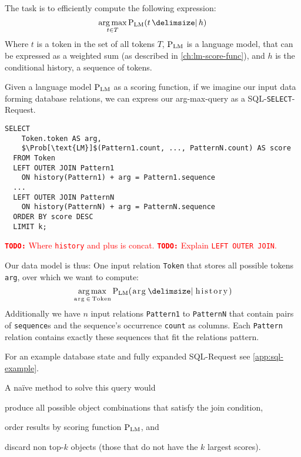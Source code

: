 \documentclass[11pt,a4paper]{report}
\DeclareMathOperator*{\Argmax}{arg\,max}
\newcommand{\inlinecode}[1]{\lstinline[columns=fixed]{#1}}
\newcommand{\todo}[1]{\textcolor{red}{{\footnotesize\textbf{\texttt{TODO:}}} #1}}
\begin{document}
The task is to efficiently compute the following expression:
\begin{equation}
  \Argmax_{t \in T} \Prob[\text{LM}]{t}{h}
\end{equation}
Where $t$ is a token in the set of all tokens $T$, $\Prob[\text{LM}]$ is a
language model, that can be expressed as a weighted sum (as described in
\cref{ch:lm-score-func}), and $h$ is the conditional history, a sequence
of tokens.

Given a language model $\Prob[\text{LM}]$ as a scoring function, if we
imagine our input data forming database relations, we can express our
arg-max-query as a SQL-\texttt{SELECT}-Request.

\begin{lstlisting}[mathescape]
  SELECT
    Token.token AS arg,
    $\Prob[\text{LM}]$(Pattern1.count, ..., PatternN.count) AS score
  FROM Token
  LEFT OUTER JOIN Pattern1
    ON history(Pattern1) + arg = Pattern1.sequence
  ...
  LEFT OUTER JOIN PatternN
    ON history(PatternN) + arg = PatternN.sequence
  ORDER BY score DESC
  LIMIT k;
\end{lstlisting}

\todo{Where \inlinecode{history} and plus is concat.}
\todo{Explain \inlinecode{LEFT OUTER JOIN}.}

Our data model is thus: One input relation \inlinecode{Token} that stores
all possible tokens \inlinecode{arg}, over which we want to compute:
\begin{equation}
  \Argmax_{\text{\inlinecode{arg}} \, \in \, \text{\inlinecode{Token}}}
    \Prob[\text{LM}]{\text{\inlinecode{arg}}}{\text{\inlinecode{history}}}
\end{equation}
Additionally we have $n$ input relations
\inlinecode{Pattern1} to \inlinecode{PatternN} that contain pairs
of \inlinecode{sequence}s and the sequence's occurrence \inlinecode{count} as
columns.
Each \inlinecode{Pattern} relation contains exactly these sequences that fit the
relations pattern.

For an example database state and fully expanded SQL-Request see
\cref{app:sql-example}.

A naïve method to solve this query would
\begin{inparaenum}[(1)]
  \item produce all possible object combinations that satisfy the join
    condition,
  \item order results by scoring function $\Prob[\text{LM}]$, and
  \item discard non top-$k$ objects (those that do not have the $k$ largest
    scores).
\end{inparaenum}
\end{document}
